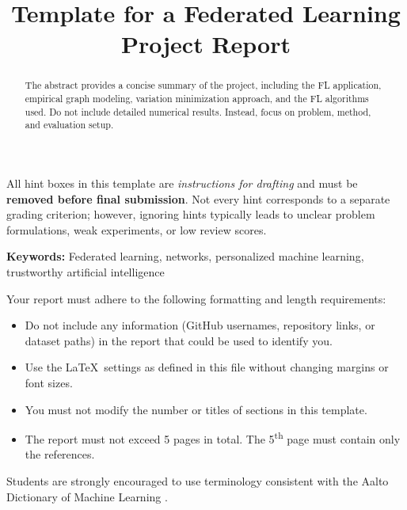 \documentclass[9pt]{article}
\title{Template for a Federated Learning Project Report}
\begin{document}
	


	\maketitle
	
	\begin{hintbox}
		All hint boxes in this template are \emph{instructions for drafting} and must be
		\textbf{removed before final submission}. Not every hint corresponds to a
		separate grading criterion; however, ignoring hints typically leads to unclear
		problem formulations, weak experiments, or low review scores.
	\end{hintbox}
	
\begin{abstract}
	\begin{hintbox}
The abstract provides a concise summary of the project, including the FL application, 
empirical graph modeling, variation minimization approach, and the FL algorithms used. 
Do not include detailed numerical results. Instead, focus on problem, method, and evaluation setup.
\end{hintbox}
\end{abstract}
	
\textbf{Keywords:} Federated learning, networks, personalized machine learning, trustworthy artificial intelligence
	
\begin{hintbox}
	Your report must adhere to the following formatting and length requirements:
	\noindent
\begin{itemize}
	\item Do not include any information (GitHub usernames, repository links, or dataset paths) 
	           in the report that could be used to identify you. 
	\item Use the \LaTeX\ settings as defined in this file without changing margins or font sizes.
	\item You must not modify the number or titles of sections in this template. 
	\item The report must not exceed 5 pages in total. The 5\textsuperscript{th} page must 
	contain only the references.
		\end{itemize}
\end{hintbox}

\begin{hintbox}
Students are strongly encouraged to use terminology consistent with the
Aalto Dictionary of Machine Learning \cite{AaltoDictML}.
\end{hintbox}
\end{document}
